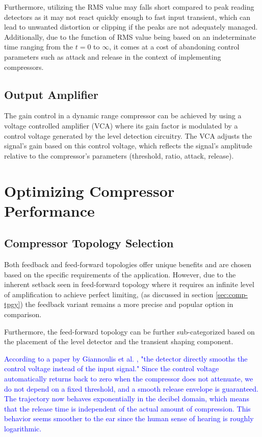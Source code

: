 \documentclass[10pt]{article}
\begin{document}
\begin{multicols*}{2}
                    Furthermore, utilizing the RMS value may falls short compared to peak reading detectors as it may not react quickly enough to fast input transient, which can lead to unwanted distortion or clipping if the peaks are not adequately managed. Additionally, due to the function of RMS value being based on an indeterminate time ranging from the $t=0$ to $\infty$, it comes at a cost of abandoning control parameters such as attack and release in the context of implementing compressors.

                    \columnbreak

            \subsection{Output Amplifier}
                The gain control in a dynamic range compressor can be achieved by using a voltage controlled amplifier (VCA) where its gain factor is modulated by a control voltage generated by the level detection circuitry. The VCA adjusts the signal's gain based on this control voltage, which reflects the signal's amplitude relative to the compressor's parameters (threshold, ratio, attack, release).
        
        \section[Optimizing Compressor Performance]{Optimizing Compressor\\Performance}
            
            \subsection{Compressor Topology Selection}
                Both feedback and feed-forward topologies offer unique benefits and are chosen based on the specific requirements of the application. However, due to the inherent setback seen in feed-forward topology where it requires an infinite level of amplification to achieve perfect limiting, (as discussed in section \ref{sec:comp-tpgy}) the feedback variant remains a more precise and popular option in comparison.\par
                Furthermore, the feed-forward topology can be further sub-categorized based on the placement of the level detector and the transient shaping component.

                \textcolor{blue}{According to a paper by Giannoulis et al. \cite{drc-tutorial}, "the detector directly smooths the control voltage instead of the input signal." Since the control voltage automatically returns back to zero when the compressor does not attenuate, we do not depend on a fixed threshold, and a smooth release envelope is guaranteed. The trajectory now behaves exponentially in the decibel domain, which means that the release time is independent of the actual amount of compression. This behavior seems smoother to the ear since the human sense of hearing is roughly logarithmic.} 


\end{multicols*}
\end{document}
